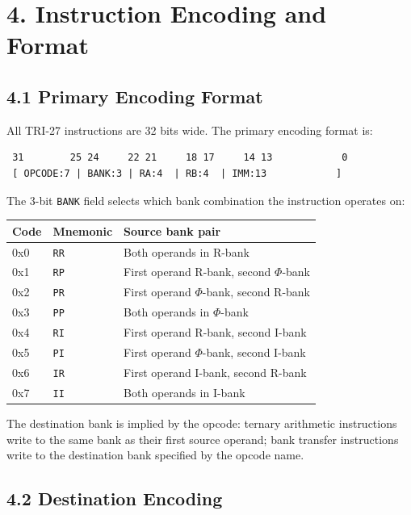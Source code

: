 \section{4. Instruction Encoding and Format}\label{fa_71:instruction-encoding}

\subsection{4.1 Primary Encoding Format}\label{fa_71:primary-encoding}

All TRI-27 instructions are 32 bits wide. The primary encoding
format is:

\begin{verbatim}
 31        25 24     22 21     18 17     14 13            0
 [ OPCODE:7 | BANK:3 | RA:4  | RB:4  | IMM:13            ]
\end{verbatim}

The 3-bit \texttt{BANK} field selects which bank combination
the instruction operates on:

\begin{longtable}[]{@{}lll@{}}
\toprule\noalign{}
Code & Mnemonic & Source bank pair \\
\midrule\noalign{}
\endhead
\bottomrule\noalign{}
\endlastfoot
0x0 & \texttt{RR} & Both operands in R-bank \\
0x1 & \texttt{RP} & First operand R-bank, second $\Phi$-bank \\
0x2 & \texttt{PR} & First operand $\Phi$-bank, second R-bank \\
0x3 & \texttt{PP} & Both operands in $\Phi$-bank \\
0x4 & \texttt{RI} & First operand R-bank, second I-bank \\
0x5 & \texttt{PI} & First operand $\Phi$-bank, second I-bank \\
0x6 & \texttt{IR} & First operand I-bank, second R-bank \\
0x7 & \texttt{II} & Both operands in I-bank \\
\end{longtable}

The destination bank is implied by the opcode: ternary arithmetic
instructions write to the same bank as their first source operand;
bank transfer instructions write to the destination bank specified
by the opcode name.

\subsection{4.2 Destination Encoding}\label{fa_71:destination-encoding}

